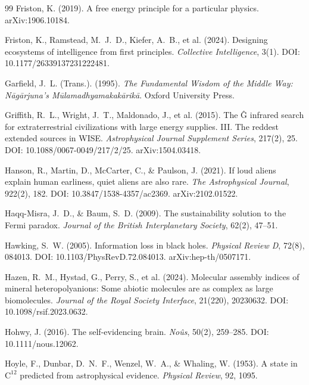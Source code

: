 \documentclass[12pt, a4paper]{article}
\begin{document}
\begin{thebibliography}{99}
Friston, K. (2019). A free energy principle for a particular physics. arXiv:1906.10184.

Friston, K., Ramstead, M.~J.~D., Kiefer, A.~B., et al. (2024). Designing ecosystems of
intelligence from first principles. \textit{Collective Intelligence}, 3(1).
DOI: 10.1177/26339137231222481.

Garfield, J.~L. (Trans.). (1995). \textit{The Fundamental Wisdom of the Middle Way:
N\={a}g\={a}rjuna's M\={u}lamadhyamakak\={a}rik\={a}}. Oxford University Press.

Griffith, R.~L., Wright, J.~T., Maldonado, J., et al. (2015). The Ĝ infrared search for
extraterrestrial civilizations with large energy supplies. III. The reddest extended sources
in WISE. \textit{Astrophysical Journal Supplement Series}, 217(2), 25.
DOI: 10.1088/0067-0049/217/2/25. arXiv:1504.03418.

Hanson, R., Martin, D., McCarter, C., \& Paulson, J. (2021). If loud aliens explain human
earliness, quiet aliens are also rare. \textit{The Astrophysical Journal}, 922(2), 182.
DOI: 10.3847/1538-4357/ac2369. arXiv:2102.01522.

Haqq-Misra, J.~D., \& Baum, S.~D. (2009). The sustainability solution to the Fermi paradox.
\textit{Journal of the British Interplanetary Society}, 62(2), 47--51.

Hawking, S.~W. (2005). Information loss in black holes. \textit{Physical Review D},
72(8), 084013. DOI: 10.1103/PhysRevD.72.084013. arXiv:hep-th/0507171.

Hazen, R.~M., Hystad, G., Perry, S., et al. (2024). Molecular assembly indices of mineral
heteropolyanions: Some abiotic molecules are as complex as large biomolecules. \textit{Journal
of the Royal Society Interface}, 21(220), 20230632.
DOI: 10.1098/rsif.2023.0632.

Hohwy, J. (2016). The self-evidencing brain. \textit{No\^{u}s}, 50(2), 259--285.
DOI: 10.1111/nous.12062.

Hoyle, F., Dunbar, D.~N.~F., Wenzel, W.~A., \& Whaling, W. (1953). A state in
$\mathrm{C}^{12}$ predicted from astrophysical evidence. \textit{Physical Review}, 92, 1095.


\end{thebibliography}
\end{document}
